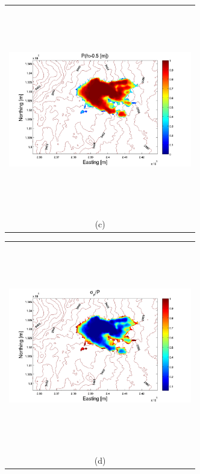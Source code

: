 \documentclass[12pt]{article}
\newcommand{\Pic}[2][0.85]{\begin{center}\texttt{[image: \#2]}
 \end{center} }
\begin{document}
\begin{figure}[H]
\begin{minipage}{0.6\textwidth}
    \end{minipage} 
        \begin{minipage}[b]{0.6\textwidth}
        \begin{tabular}{c}
       \includegraphics[width=8cm,height=9cm,keepaspectratio]{Galeras_3_P.pdf}\\
        (c)
        \end{tabular}
    \end{minipage}
    \begin{minipage}{0.6\textwidth}
        \begin{tabular}{c}
	\includegraphics[width=8cm,height=9cm,keepaspectratio]{Galeras_3_sigma.pdf}\\
        (d)
        \end{tabular}

\end{minipage}
\end{figure}
\end{document}
